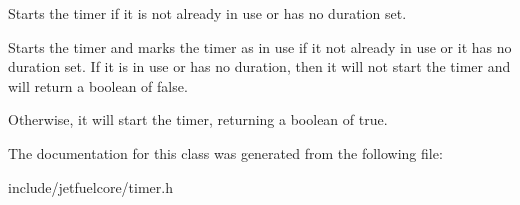 Starts the timer if it is not already in use or has no duration set. 

Starts the timer and marks the timer as in use if it not already in use or it has no duration set. If it is in use or has no duration, then it will not start the timer and will return a boolean of false.

Otherwise, it will start the timer, returning a boolean of true. 

The documentation for this class was generated from the following file\+:\begin{DoxyCompactItemize}
\item 
include/jetfuelcore/timer.\+h\end{DoxyCompactItemize}
